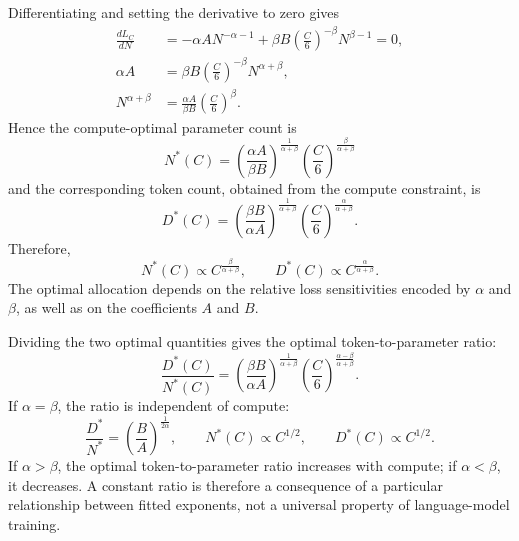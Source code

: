 Differentiating and setting the derivative to zero gives
\begin{align}
    \frac{dL_C}{dN}
    &=
    -\alpha AN^{-\alpha-1}
    +\beta B\left(\frac{C}{6}\right)^{-\beta}
       N^{\beta-1}=0, \nonumber\\
    \alpha A
    &=
    \beta B\left(\frac{C}{6}\right)^{-\beta}
       N^{\alpha+\beta}, \nonumber\\
    N^{\alpha+\beta}
    &=
    \frac{\alpha A}{\beta B}
       \left(\frac{C}{6}\right)^\beta.
    \label{eq:scaling-optimum-derivation}
\end{align}
Hence the compute-optimal parameter count is
\begin{equation}
    \boxed{
    N^*(C)
    =
    \left(\frac{\alpha A}{\beta B}\right)^{
        \frac{1}{\alpha+\beta}}
    \left(\frac{C}{6}\right)^{
        \frac{\beta}{\alpha+\beta}}
    }
    \label{eq:scaling-optimal-parameters}
\end{equation}
and the corresponding token count, obtained from the compute constraint, is
\begin{equation}
    \boxed{
    D^*(C)
    =
    \left(\frac{\beta B}{\alpha A}\right)^{
        \frac{1}{\alpha+\beta}}
    \left(\frac{C}{6}\right)^{
        \frac{\alpha}{\alpha+\beta}}
    }.
    \label{eq:scaling-optimal-tokens}
\end{equation}
Therefore,
\begin{equation}
    N^*(C)\propto C^{\frac{\beta}{\alpha+\beta}},
    \qquad
    D^*(C)\propto C^{\frac{\alpha}{\alpha+\beta}}.
    \label{eq:scaling-optimal-exponents}
\end{equation}
The optimal allocation depends on the relative loss sensitivities encoded by
\(\alpha\) and \(\beta\), as well as on the coefficients \(A\) and \(B\).

Dividing the two optimal quantities gives the optimal token-to-parameter
ratio:
\begin{equation}
    \boxed{
    \frac{D^*(C)}{N^*(C)}
    =
    \left(\frac{\beta B}{\alpha A}\right)^{
        \frac{1}{\alpha+\beta}}
    \left(\frac{C}{6}\right)^{
        \frac{\alpha-\beta}{\alpha+\beta}}
    }.
    \label{eq:scaling-optimal-ratio}
\end{equation}
If \(\alpha=\beta\), the ratio is independent of compute:
\begin{equation}
    \frac{D^*}{N^*}
    =
    \left(\frac{B}{A}\right)^{\frac{1}{2\alpha}},
    \qquad
    N^*(C)\propto C^{1/2},
    \qquad
    D^*(C)\propto C^{1/2}.
    \label{eq:scaling-constant-ratio}
\end{equation}
If \(\alpha>\beta\), the optimal token-to-parameter ratio increases with
compute; if \(\alpha<\beta\), it decreases. A constant ratio is therefore a
consequence of a particular relationship between fitted exponents, not a
universal property of language-model training.

